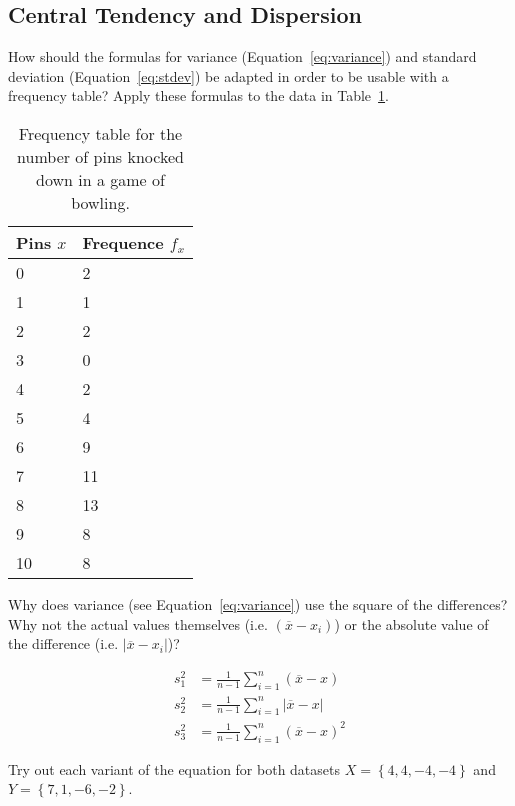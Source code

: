 \subsection{Central Tendency and Dispersion}

\begin{exercise}
  How should the formulas for variance (Equation~\ref{eq:variance}) and standard deviation (Equation~\ref{eq:stdev}) be adapted in order to be usable with a frequency table? Apply these formulas to the data in Table~\ref{tab:pinfreq}.
\end{exercise}

\begin{table}
  \centering
  \begin{tabular}{@{}ll@{}}
    \toprule
    Pins $x$ & Frequence $f_{x}$ \\ \midrule
    0        & 2                 \\
    1        & 1                 \\
    2        & 2                 \\
    3        & 0                 \\
    4        & 2                 \\
    5        & 4                 \\
    6        & 9                 \\
    7        & 11                \\
    8        & 13                \\
    9        & 8                 \\
    10       & 8                 \\ \bottomrule
  \end{tabular}
  \caption{Frequency table for the number of pins knocked down in a game of bowling.}
  \label{tab:pinfreq}
\end{table}

\begin{exercise}
  \label{ex:variance-formula}
  Why does variance (see Equation~\ref{eq:variance}) use the square of the differences? Why not the actual values themselves (i.e. $(\overline{x} - x_i)$) or the absolute value of the difference (i.e. $\left|\overline{x} - x_i\right|$)?
  
  \begin{align}
  s^{2}_{1} &= \frac{1}{n-1} \sum_{i=1}^{n} (\overline{x} - x) \\
  s^{2}_{2} &= \frac{1}{n-1} \sum_{i=1}^{n} \left| \overline{x} - x\right| \\
  s^{2}_{3} &= \frac{1}{n-1} \sum_{i=1}^{n} (\overline{x} - x)^{2}
  \end{align}
  
  Try out each variant of the equation for both datasets $X = \left\{4,4,-4,-4\right\}$ and $Y = \left\{7,1,-6,-2\right\}$.
\end{exercise}


